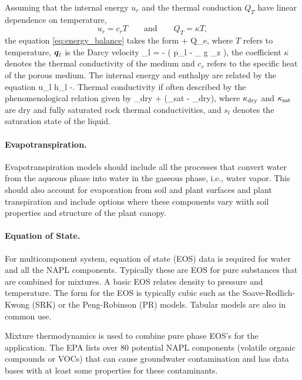 Assuming that the internal energy $u_r$ and the thermal conduction $Q_T$
have linear dependence on temperature,  
$$
  u_r = c_r T \qquad \text{and}\qquad Q_T=\kappa T,
$$
the equation \eqref{eq:energy_balance} takes the form 
\EQ
  + 
  \boldsymbol{\nabla}\cdot {} 
  \eq 
  Q_e,
\EN
where 
$T$ refers to temperature, 
${\boldsymbol{q}}_l$ is the Darcy velocity 
\EQ
  \bq_l 
  =  
  - 
  \left(
  \boldsymbol{\nabla} p_l 
  -
  \rho _{\alpha} g _z
  \right), 
\EN
the coefficient $\kappa$ denotes the thermal conductivity of the medium and 
$c_r$ refers to the specific heat of the porous medium. 
The internal energy and enthalpy are related by the equation
\EQ
  u_l \eq h_l -.
\EN
Thermal conductivity if often described by the phenomenological relation given by \citet{somerton1974high}
\EQ\label{cond} 
  \kappa \eq \kappa_{\rm dry} +  (\kappa_{\rm sat} - \kappa_{\rm dry}), 
\EN 
where $\kappa_{\rm dry}$ and $\kappa_{\rm sat}$ are dry and fully saturated rock thermal conductivities, 
and $s_l$ denotes the saturation state of the liquid. 

\paragraph{Evapotranspiration. } 
Evapotranspiration models should include all the processes that convert water from the aqueous phase into water in the gaseous phase, 
i.e., water vapor.  
This should also account for evaporation from soil and plant surfaces and plant transpiration and include options 
where these components vary wiith soil properties and structure of the plant canopy.

\paragraph{Equation of State.}

For multicomponent system, equation of state (EOS) data is required for water and all the NAPL components.  
Typically these are EOS for pure substances that are combined for mixtures.  
A basic EOS relates density to pressure and temperature.  
The form for the EOS is typically cubic such as the Soave-Redlich-Kwong (SRK) or the
Peng-Robinson (PR) models.  
Tabular models are also in common use.

Mixture thermodynamics is used to combine pure phase EOS's for the application.  
The EPA lists over 80 potential NAPL components
(volatile organic compounds or VOCs) that can cause groundwater
contamination and has data bases with at least some properties for these
contaminants.


